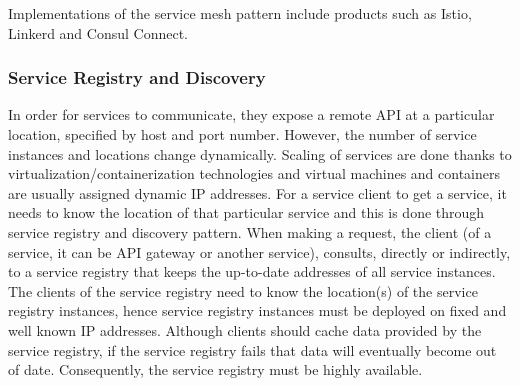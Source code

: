 \documentclass{Configuration_Files/PoliMi3i_thesis}
\begin{document}
Implementations of the service mesh pattern include products such as Istio, Linkerd and Consul Connect.

\subsubsection{Service Registry and Discovery}
\label{subsubsec:srd}

In order for services to communicate, they expose a remote API at a particular location, specified by host and port number.
However, the number of service instances and locations change dynamically.
Scaling of services are done thanks to virtualization/containerization technologies and virtual machines and containers are usually assigned dynamic IP addresses.
For a service client to get a service, it needs to know the location of that particular service and this is done through service registry and discovery pattern.
When making a request, the client (of a service, it can be API gateway or another service), consults, directly or indirectly, to a service registry that keeps the up-to-date addresses of all service instances.
The clients of the service registry need to know the location(s) of the service registry instances, hence service registry instances must be deployed on fixed and well known IP addresses.
Although clients should cache data provided by the service registry, if the service registry fails that data will eventually become out of date. 
Consequently, the service registry must be highly available.
\end{document}
